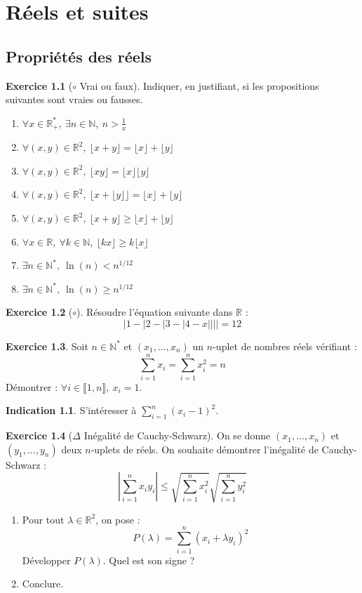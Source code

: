 \documentclass[french]{book}
\newcommand{\N}{\mathbb{N}}
\newcommand{\R}{\mathbb{R}}
\newcommand{\st}{^*}
\theoremstyle{definition}
\newtheorem{ex}{Exercice}[chapter]
\theoremstyle{theorem}
\newtheorem*{ind}{Indication}
\theoremstyle{remark}
\begin{document}
\chapter{Réels et suites}

\section{Propriétés des réels}

\begin{ex}[$\circ$ Vrai ou faux]
	Indiquer, en justifiant, si les propositions suivantes sont vraies ou fausses.
	\begin{enumerate}
		\item $\forall x\in\R_+\st,\ \exists n\in\N,\ n>\displaystyle\frac{1}{x}$
		\item $\forall (x,y)\in\R^2,\ \lfloor x+y\rfloor=\lfloor x\rfloor+\lfloor y\rfloor$
		\item $\forall (x,y)\in\R^2,\ \lfloor xy\rfloor=\lfloor x\rfloor\lfloor y\rfloor$
		\item $\forall (x,y)\in\R^2,\ \lfloor x+\lfloor y\rfloor\rfloor=\lfloor x\rfloor+\lfloor y\rfloor$
		\item $\forall (x,y)\in\R^2,\ \lfloor x+y\rfloor\geqslant \lfloor x\rfloor+\lfloor y\rfloor$
		\item $\forall x\in\R,\ \forall k\in\N,\ \lfloor kx\rfloor\geqslant k\lfloor x\rfloor$
		\item $\exists n\in\N\st,\ \ln(n)<n^{1/12}$
		\item $\exists n\in\N\st,\ \ln(n)\geqslant n^{1/12}$
	\end{enumerate}
\end{ex}

\begin{ex}[$\circ$]
	Résoudre l'équation suivante dans $\R$ : $$\lvert 1-\lvert 2-\lvert 3-\lvert 4-x\rvert\rvert\rvert\rvert=12$$
\end{ex}

\begin{ex}
	Soit $n\in\N\st$ et $(x_1,\ldots,x_n)$ un $n$-uplet de nombres réels vérifiant : $$\sum_{i=1}^{n}x_i=\sum_{i=1}^{n}x_i^2=n$$ Démontrer : $\forall i\in\llbracket 1,n\rrbracket,\ x_i=1$.
\end{ex}

\begin{ind}
	S'intéresser à $\displaystyle\sum_{i=1}^{n}(x_i-1)^2$.
\end{ind}

\begin{ex}[$\Delta$ Inégalité de Cauchy-Schwarz]
	On se donne $(x_1,\ldots,x_n)$ et $(y_1,\ldots,y_n)$ deux $n$-uplets de réels. On souhaite démontrer l'inégalité de Cauchy-Schwarz : $$\left\lvert\sum_{i=1}^{n}x_iy_i\right\rvert\leqslant\sqrt{\sum_{i=1}^{n}x_i^2}\sqrt{\sum_{i=1}^{n}y_i^2}$$
	\begin{enumerate}
		\item Pour tout $\lambda\in\R^2$, on pose : $$P(\lambda)=\sum_{i=1}^{n}(x_i+\lambda y_i)^2$$ Développer $P(\lambda)$. Quel est son signe ?
		\item Conclure.
	\end{enumerate}
\end{ex}
\end{document}
